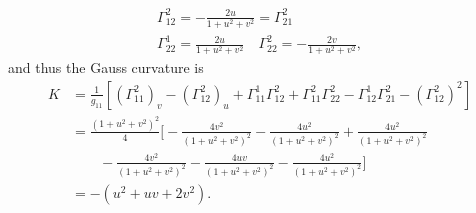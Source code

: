 \documentclass[a4paper,12pt]{article}
\theoremstyle{remark}
\begin{document}
\begin{enumerate}
\begin{enumerate}
\begin{gather*}
                    \Gamma_{12}^2 = -\frac{2u}{1 + u^2 + v^2} = \Gamma_{21}^2 \\
                    \Gamma_{22}^1 = \frac{2u}{1 + u^2 + v^2} \quad
                    \Gamma_{22}^2 = -\frac{2v}{1 + u^2 + v^2},
                \end{gather*}
                and thus the Gauss curvature is
                \begin{align*}
                    K &= \frac{1}{g_{11}} \left[ (\Gamma_{11}^2)_v - (\Gamma_{12}^2)_u + \Gamma_{11}^1 \Gamma_{12}^2 + \Gamma_{11}^2 \Gamma_{22}^2 - \Gamma_{12}^1 \Gamma_{21}^2 - (\Gamma_{12}^2)^2 \right] \\
                    &= \frac{(1 + u^2 + v^2)^2}{4} \biggl[ -\frac{4v^2}{(1 + u^2 + v^2)^2} - \frac{4u^2}{(1 + u^2 + v^2)^2} + \frac{4u^2}{(1 + u^2 + v^2)^2} \\
                    &\qquad- \frac{4v^2}{(1 + u^2 + v^2)^2} - \frac{4uv}{(1 + u^2 + v^2)^2} - \frac{4u^2}{(1 + u^2 + v^2)^2} \biggr] \\
                    &= -(u^2 + uv + 2v^2).
                \end{align*}


\end{enumerate}
\end{enumerate}
\end{document}
